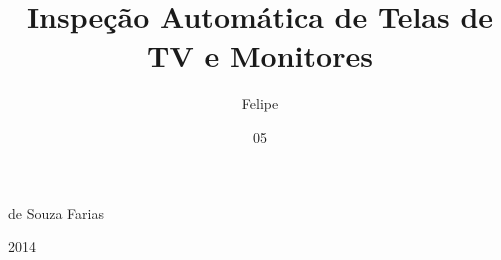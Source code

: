 


\newcommand{\tittese}{%
	\textsf{\bfseries\Large INSPEÇÃO AUTOMÁTICA DE TELAS DE TV E MONITORES\\
	\vspace{0.8ex}
        }}



\newcommand{\descrtese}{%
\hspace{\stretch{1}}\parbox{0.51\textwidth}{%
Dissertação apresentada ao Programa de P\'os-Gradua\c{c}\~ao em Engenharia Elétrica da Universidade Federal do Amazonas, como requisito parcial para obten\c{c}\~ao do t\'{\i}tulo de Mestre em Engenharia Elétrica na \'area de concentra\c{c}\~ao Controle e Automação de Sistemas.
}}


\title{Inspeção Automática de Telas de TV e Monitores}
\author{Felipe}{de Souza Farias}
\date{05}{2014}


\pagestyle{empty}

